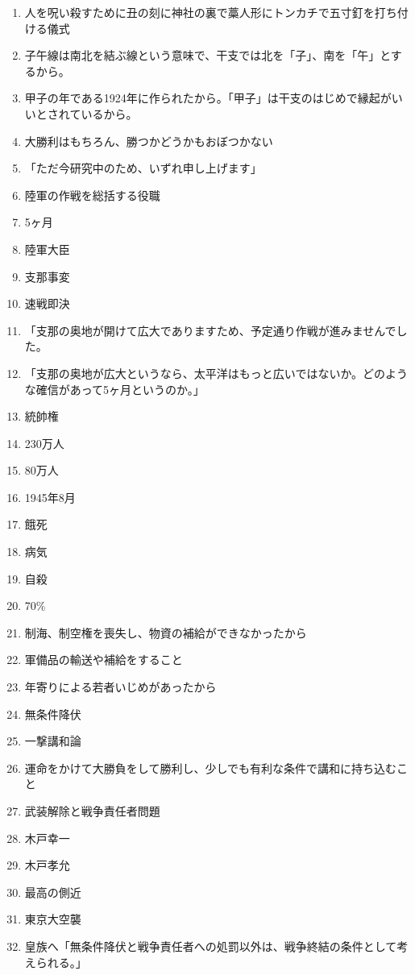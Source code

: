 \documentclass[]{jsarticle}
\begin{document}
\begin{enumerate}
	\item 人を呪い殺すために丑の刻に神社の裏で藁人形にトンカチで五寸釘を打ち付ける儀式
	\item 子午線は南北を結ぶ線という意味で、干支では北を「子」、南を「午」とするから。
	\item 甲子の年である1924年に作られたから。「甲子」は干支のはじめで縁起がいいとされているから。
		\\
	\item 大勝利はもちろん、勝つかどうかもおぼつかない
	\item 「ただ今研究中のため、いずれ申し上げます」
	\item 陸軍の作戦を総括する役職
	\item 5ヶ月
	\item 陸軍大臣
	\item 支那事変
	\item 速戦即決
	\item 「支那の奥地が開けて広大でありますため、予定通り作戦が進みませんでした。
	\item 「支那の奥地が広大というなら、太平洋はもっと広いではないか。どのような確信があって5ヶ月というのか。」
	\item 統帥権
	\item 230万人
	\item 80万人
	\item 1945年8月
	\item 餓死
	\item 病気
	\item 自殺
	\item 70\%
	\item 制海、制空権を喪失し、物資の補給ができなかったから
	\item 軍備品の輸送や補給をすること
	\item 年寄りによる若者いじめがあったから
		\\
	\item 無条件降伏
	\item 一撃講和論
	\item 運命をかけて大勝負をして勝利し、少しでも有利な条件で講和に持ち込むこと
		\\
	\item 武装解除と戦争責任者問題
	\item 木戸幸一
	\item 木戸孝允
	\item 最高の側近
	\item 東京大空襲
	\item 皇族へ「無条件降伏と戦争責任者への処罰以外は、戦争終結の条件として考えられる。」

\end{enumerate}
\end{document}
